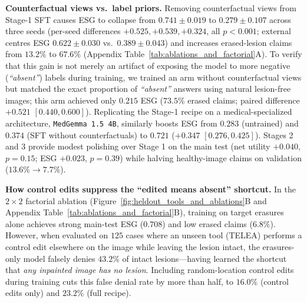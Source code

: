 \documentclass{article} %
\begin{document}
\textbf{Counterfactual views vs.\ label priors.} Removing counterfactual views from Stage-1 SFT causes ESG to collapse from $0.741 \pm 0.019$ to $0.279 \pm 0.107$ across three seeds (per-seed differences $+0.525, +0.539, +0.324$, all $p < 0.001$; external centres ESG $0.622 \pm 0.030$ vs.\ $0.389 \pm 0.043$) and increases erased-lesion claims from $13.2\%$ to $67.6\%$ (Appendix Table~\ref{tab:ablations_and_factorial}A). To verify that this gain is not merely an artifact of exposing the model to more negative (\emph{``absent''}) labels during training, we trained an arm without counterfactual views but matched the exact proportion of \emph{``absent''} answers using natural lesion-free images; this arm achieved only $0.215$ ESG ($73.5\%$ erased claims; paired difference $+0.521$ $[0.440, 0.600]$). Replicating the Stage-1 recipe on a medical-specialized architecture, \texttt{MedGemma 1.5 4B}, similarly boosts ESG from $0.283$ (untrained) and $0.374$ (SFT without counterfactuals) to $0.721$ ($+0.347$ $[0.276, 0.425]$). Stages 2 and 3 provide modest polishing over Stage 1 on the main test (net utility $+0.040$, $p = 0.15$; ESG $+0.023$, $p = 0.39$) while halving healthy-image claims on validation ($13.6\% \to 7.7\%$).

\textbf{How control edits suppress the ``edited means absent'' shortcut.} In the $2\times 2$ factorial ablation (Figure~\ref{fig:heldout_tools_and_ablations}B and Appendix Table~\ref{tab:ablations_and_factorial}B), training on target erasures alone achieves strong main-test ESG ($0.708$) and low erased claims ($6.8\%$). However, when evaluated on $125$ cases where an unseen tool (TELEA) performs a control edit elsewhere on the image while leaving the lesion intact, the erasures-only model falsely denies $43.2\%$ of intact lesions---having learned the shortcut that \emph{any inpainted image has no lesion}. Including random-location control edits during training cuts this false denial rate by more than half, to $16.0\%$ (control edits only) and $23.2\%$ (full recipe).
\end{document}
